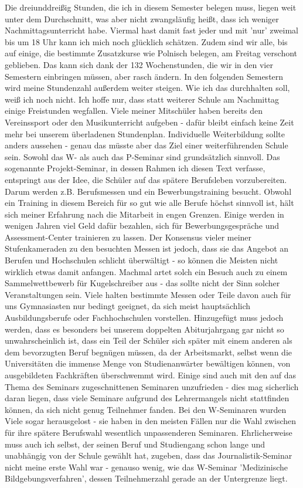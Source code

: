 \documentclass[a4paper,12pt,twoside]{scrbook}
\begin{document}
Die dreiunddreißig Stunden, die ich in diesem Semester belegen muss, liegen weit unter dem Durchschnitt, was aber nicht zwangsläufig heißt, dass ich weniger Nachmittagsunterricht habe. Viermal hast damit fast jeder und mit 'nur' zweimal bis um 18 Uhr kann ich mich noch glücklich schätzen. Zudem sind wir alle, bis auf einige, die bestimmte Zusatzkurse wie Polnisch belegen, am Freitag verschont geblieben. Das kann sich dank der 132 Wochenstunden, die wir in den vier Semestern einbringen müssen, aber rasch ändern. In den folgenden Semestern wird meine Stundenzahl außerdem weiter steigen. Wie ich das durchhalten soll, weiß ich noch nicht. Ich hoffe nur, dass statt weiterer Schule am Nachmittag einige Freistunden wegfallen.
Viele meiner Mitschüler haben bereits den Vereinssport oder den Musikunterricht aufgeben - dafür bleibt einfach keine Zeit mehr bei unserem überladenen Stundenplan. Individuelle Weiterbildung sollte anders aussehen - genau das müsste aber das Ziel einer weiterführenden Schule sein.
Sowohl das W- als auch das P-Seminar sind grundsätzlich sinnvoll. Das sogenannte Projekt-Seminar, in dessen Rahmen ich diesen Text verfasse, entspringt aus der Idee, die Schüler auf das spätere Berufsleben vorzubereiten. Darum werden z.B. Berufsmessen und ein Bewerbungstraining besucht. Obwohl ein Training in diesem Bereich für so gut wie alle Berufe höchst sinnvoll ist, hält sich meiner Erfahrung nach die Mitarbeit in engen Grenzen. Einige werden in wenigen Jahren viel Geld dafür bezahlen, sich für Bewerbungsgespräche und Assessment-Center trainieren zu lassen. Der Konsensus vieler meiner Stufenkameraden zu den besuchten Messen ist jedoch, dass sie das Angebot an Berufen und Hochschulen schlicht überwältigt - so können die Meisten nicht wirklich etwas damit anfangen. Machmal artet solch ein Besuch auch zu einem Sammelwettbewerb für Kugelschreiber aus - das sollte nicht der Sinn solcher Veranstaltungen sein. Viele halten bestimmte Messen oder Teile davon auch für uns Gymnasiasten nur bedingt geeignet, da sich meist hauptsächlich Ausbildungsberufe oder Fachhochschulen vorstellen. Hinzugefügt muss jedoch werden, dass es besonders bei unserem doppelten Abiturjahrgang gar nicht so unwahrscheinlich ist, dass ein Teil der Schüler sich später mit einem anderen als dem bevorzugten Beruf begnügen müssen, da der Arbeitsmarkt, selbst wenn die Universitäten die immense Menge von Studienanwärter bewältigen können, von ausgebildeten Fachkräften überschwemmt wird. Einige sind auch mit den auf das Thema des Seminars zugeschnittenen Seminaren unzufrieden - dies mag sicherlich daran liegen, dass viele Seminare aufgrund des Lehrermangels nicht stattfinden können, da sich nicht genug Teilnehmer fanden. Bei den W-Seminaren wurden Viele sogar herausgelost - sie haben in den meisten Fällen nur die Wahl zwischen für ihre spätere Berufswahl wesentlich unpassenderen Seminaren. Ehrlicherweise muss auch ich selbst, der seinen Beruf und Studiengang schon lange und unabhängig von der Schule gewählt hat, zugeben, dass das Journalistik-Seminar nicht meine erste Wahl war - genauso wenig, wie das W-Seminar 'Medizinische Bildgebungsverfahren', dessen Teilnehmerzahl gerade an der Untergrenze liegt.
\end{document}

